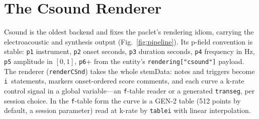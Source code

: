 \documentclass[runningheads,a4paper]{llncs}
\begin{document}
\section{The Csound Renderer}\label{sec:csound}

Csound is the oldest backend and fixes the paclet's rendering idiom, carrying
the electroacoustic and synthesis output (Fig.~\ref{fig:pipeline}). Its p-field
convention is stable: \texttt{p1} instrument, \texttt{p2} onset seconds,
\texttt{p3} duration seconds, \texttt{p4} frequency in Hz, \texttt{p5} amplitude
in $[0,1]$, \texttt{p6}+ from the entity's \texttt{rendering["csound"]} payload.
The renderer (\texttt{renderCSnd}) takes the whole stemData: notes and triggers
become \texttt{i}~statements, markers onset-ordered score comments, and each
curve a k-rate control signal in a global variable---an \texttt{f}-table reader
or a generated \texttt{transeg}, per session choice. In the \texttt{f}-table
form the curve is a GEN-2 table (512 points by default, a session parameter)
read at k-rate by \texttt{tablei} with linear interpolation.
\end{document}
